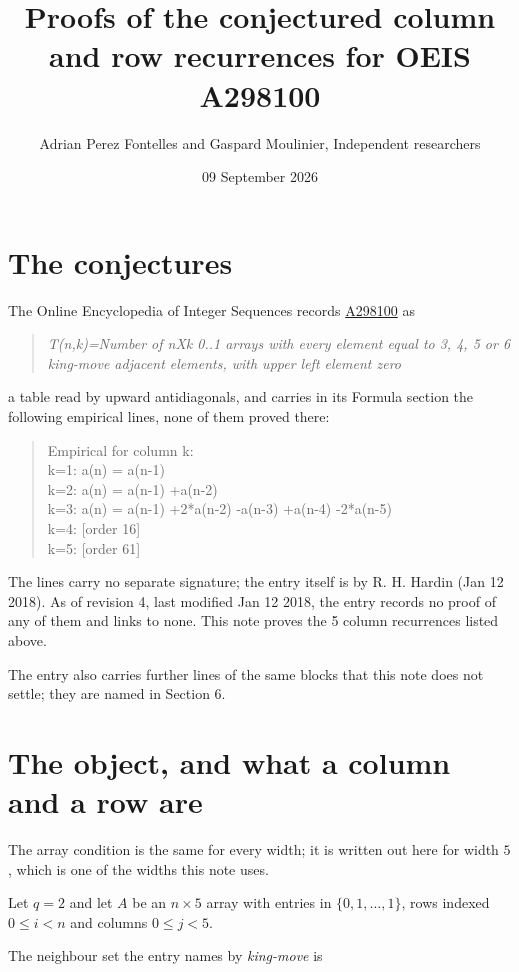 \documentclass[11pt]{article}
\title{Proofs of the conjectured column and row recurrences for OEIS A298100}
\author{Adrian Perez Fontelles and Gaspard Moulinier, Independent researchers}
\date{09 September 2026}
\theoremstyle{definition}
\begin{document}
\maketitle
\section{The conjectures}

The Online Encyclopedia of Integer Sequences records \href{https://oeis.org/A298100}{A298100} as

\begin{quote}\itshape T(n,k)=Number of nXk 0..1 arrays with every element equal to 3, 4, 5 or 6 king-move adjacent elements, with upper left element zero\end{quote}

a table read by upward antidiagonals, and carries in its Formula section the following empirical lines, none of them proved there:

\begin{quote}\ttfamily Empirical for column k:\\
k=1: a(n) = a(n-1)\\k=2: a(n) = a(n-1) +a(n-2)\\k=3: a(n) = a(n-1) +2*a(n-2) -a(n-3) +a(n-4) -2*a(n-5)\\k=4: [order 16]\\k=5: [order 61]\end{quote}

The lines carry no separate signature; the entry itself is by R. H. Hardin (Jan 12 2018). As of revision 4, last modified Jan 12 2018, the entry records no proof of any of them and links to none. This note proves the 5 column recurrences listed above.

The entry also carries further lines of the same blocks that this note does not settle; they are named in Section 6.

\section{The object, and what a column and a row are}

The array condition is the same for every width; it is written out here for width $5$, which is one of the widths this note uses.

Let $q = 2$ and let $A$ be an $n \times 5$ array with entries in $\{0,1,\dots,1\}$, rows indexed $0 \le i < n$ and columns $0 \le j < 5$.

The neighbour set the entry names by {\itshape king-move} is
\end{document}
